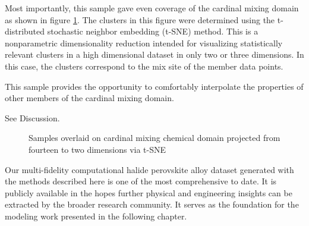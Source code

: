 Most importantly, this sample gave even coverage of the cardinal mixing domain as shown in figure \ref{fig:coverage}.
The clusters in this figure were determined using the t-distributed stochastic neighbor embedding (t-SNE) method.
This is a nonparametric dimensionality reduction intended for visualizing statistically relevant clusters in a high dimensional dataset in only two or three dimensions.
In this case, the clusters correspond to the mix site of the member data points.

This sample provides the opportunity to comfortably interpolate the properties of other members of the cardinal mixing domain.

See Discussion.

 
\begin{figure}[htbp]
\centering

\caption{\label{fig:coverage} Samples overlaid on cardinal mixing chemical domain projected from fourteen to two dimensions via t-SNE}
\end{figure}

Our multi-fidelity computational halide perovskite alloy dataset generated with the methods described here is one of the most comprehensive to date.
It is publicly available in the hopes further physical and engineering insights can be extracted by the broader research community.
It serves as the foundation for the modeling work presented in the following chapter.

